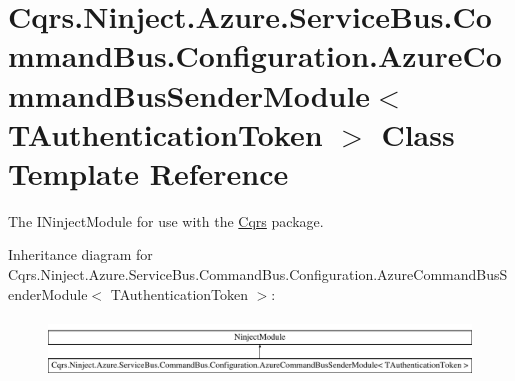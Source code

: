 \hypertarget{classCqrs_1_1Ninject_1_1Azure_1_1ServiceBus_1_1CommandBus_1_1Configuration_1_1AzureCommandBusSenderModule}{}\section{Cqrs.\+Ninject.\+Azure.\+Service\+Bus.\+Command\+Bus.\+Configuration.\+Azure\+Command\+Bus\+Sender\+Module$<$ T\+Authentication\+Token $>$ Class Template Reference}
\label{classCqrs_1_1Ninject_1_1Azure_1_1ServiceBus_1_1CommandBus_1_1Configuration_1_1AzureCommandBusSenderModule}


The I\+Ninject\+Module for use with the \hyperlink{namespaceCqrs}{Cqrs} package.  


Inheritance diagram for Cqrs.\+Ninject.\+Azure.\+Service\+Bus.\+Command\+Bus.\+Configuration.\+Azure\+Command\+Bus\+Sender\+Module$<$ T\+Authentication\+Token $>$\+:\begin{figure}[H]
\begin{center}
\leavevmode
\includegraphics[height=1.604584cm]{classCqrs_1_1Ninject_1_1Azure_1_1ServiceBus_1_1CommandBus_1_1Configuration_1_1AzureCommandBusSenderModule}
\end{center}
\end{figure}
